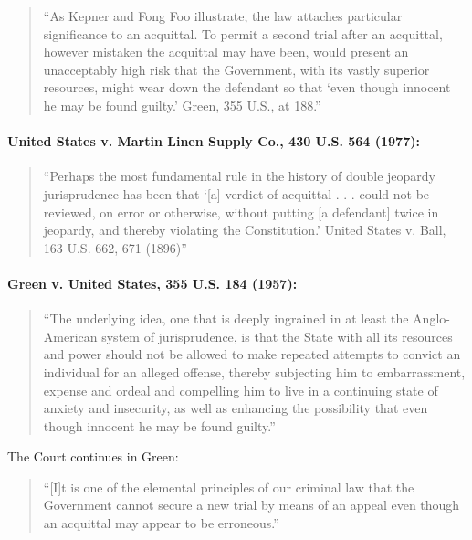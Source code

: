 \documentclass[12pt]{article}
\begin{document}
\begin{quote}
``As Kepner and Fong Foo illustrate, the law attaches particular significance to an acquittal. To permit a second trial after an acquittal, however mistaken the acquittal may have been, would present an unacceptably high risk that the Government, with its vastly superior resources, might wear down the defendant so that `even though innocent he may be found guilty.' Green, 355 U.S., at 188.''
\end{quote}



\paragraph{United States v. Martin Linen Supply Co., 430 U.S. 564 (1977):}

\begin{quote}
``Perhaps the most fundamental rule in the history of double jeopardy jurisprudence has been that `[a] verdict of acquittal . . . could not be reviewed, on error or otherwise, without putting [a defendant] twice in jeopardy, and thereby violating the Constitution.' United States v. Ball, 163 U.S. 662, 671 (1896)''
\end{quote}


\newpage

\paragraph{Green v. United States, 355 U.S. 184 (1957):}

\begin{quote}
``The underlying idea, one that is deeply ingrained in at least the Anglo-American system of jurisprudence, is that the State with all its resources and power should not be allowed to make repeated attempts to convict an individual for an alleged offense, thereby subjecting him to embarrassment, expense and ordeal and compelling him to live in a continuing state of anxiety and insecurity, as well as enhancing the possibility that even though innocent he may be found guilty.''
\end{quote}
The Court continues in Green:

\begin{quote}
``[I]t is one of the elemental principles of our criminal law that the Government cannot secure a new trial by means of an appeal even though an acquittal may appear to be erroneous.''
\end{quote}
\end{document}
